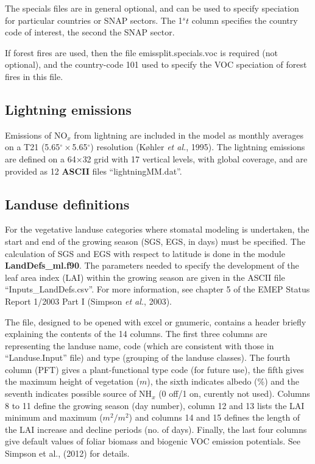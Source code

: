 The specials files are in general optional, and can be used to specify
speciation for particular countries or SNAP sectors. The
1${^st}$ column specifies the country code of interest, the second the SNAP sector. 

If forest fires are used, then the file emissplit.specials.voc is required
(not optional), and the country-code 101 used to specify the VOC speciation
of forest fires in this file.

\subsection{Lightning emissions}
Emissions of NO$_{x}$ from lightning are included in the model
as monthly averages on a T21 (5.65$^{\circ}\times$5.65$^{\circ}$) resolution (K{\o}hler {\sl et al.}, 1995). 
The lightning emissions are defined on a 64$\times$32 grid with 17 vertical
levels, with global coverage, and are provided as 12 {\bf ASCII} files
``lightningMM.dat''.

\subsection{Landuse definitions}
For the vegetative landuse categories where stomatal modeling is
undertaken, the start and end of the growing season (SGS, EGS, in days) must be specified. 
The calculation of SGS and EGS with respect to latitude is done 
in the module {\bf LandDefs\_ml.f90}. 
The parameters needed to specify the
development of the leaf area index (LAI) within the growing season
are given in the ASCII file ``Inputs\_LandDefs.csv''. 
For more information, see chapter 5  of the EMEP Status Report 1/2003 Part I (Simpson {\sl et al.}, 2003).


The file, designed to be opened with excel or gnumeric,
contains a header briefly explaining the contents of the 
14 columns. 
The first three columns are representing the landuse name, code (which
are consistent with those in ``Landuse.Input'' file) and
type (grouping of the landuse classes). The fourth column 
(PFT) gives a plant-functional type code (for future use),
 the fifth gives
the maximum height of vegetation ($m$), the sixth indicates albedo (\%) and
the seventh indicates possible source of NH$_{x}$ (0 off/1 on,
curently not used). Columns 8 to 11
define the growing season (day number), column 12 and 13 lists the
LAI minimum  and maximum ($m^{2}/m^{2}$) and 
columns 14 and 15
defines the length of the LAI increase and decline periods (no. of days).
Finally, the last four columns give default values of 
foliar biomass and biogenic VOC emission potentials. See Simpson
et al., (2012) for details.


